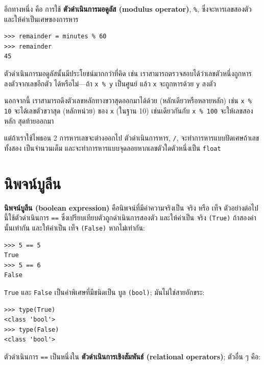 อีกทางหนึ่ง คือ การใช้ {\bf ตัวดำเนินการมอดูลัส (modulus operator)}, \verb"%", ซึ่งจะหารเลขสองตัว
และให้ค่าเป็นเศษของการหาร

\begin{verbatim}
>>> remainder = minutes % 60
>>> remainder
45
\end{verbatim}
%
ตัวดำเนินการมอดูลัสนั้นมีประโยชน์มากกว่าที่คิด เช่น เราสามารถตรวจสอบได้ว่าเลขตัวหนึ่งถูกหารลงตัวจากเลขอีกตัว
ได้หรือไม่---ถ้า {\tt x \% y} เป็นศูนย์ แล้ว {\tt x} จะถูกหารด้วย {\tt y} ลงตัว

นอกจากนี้ เราสามารถดึงตัวเลขหลักทางขวาสุดออกมาได้ด้วย (หลักเดียวหรือหลายหลัก) เช่น {\tt x \% 10} 
จะได้เลขตัวขวาสุด (หลักหน่วย) ของ {\tt x} (ในฐาน 10) เช่นเดียวกันกับ {\tt x \% 100} จะให้เลขสองหลัก
สุดท้ายออกมา

แต่ถ้าเราใช้ไพธอน 2 การหารเลขจะต่างออกไป ตัวดำเนินการหาร, \verb"/", จะทำการหารแบบปัดเศษถ้าเลขทั้งสอง
เป็นจำนวนเต็ม และจะทำการหารแบบจุดลอยหากเลขตัวใดตัวหนึ่งเป็น {\tt float}



\section{นิพจน์บูลีน} %

{\bf นิพจน์บูลีน (boolean expression)} คือนิพจน์ที่มีค่าความจริงเป็น จริง หรือ เท็จ ตัวอย่างต่อไปนี้ใช้ตัวดำเนินการ 
{\tt ==} ซึ่งเปรียบเทียบตัวถูกดำเนินการสองตัว และให้ค่าเป็น จริง {\tt (True)} ถ้าสองค่านั้นเท่ากัน และให้ค่าเป็น
เท็จ {\tt (False)} หากไม่เท่ากัน:  

\begin{verbatim}
>>> 5 == 5
True
>>> 5 == 6
False
\end{verbatim}
%
{\tt True} และ {\tt False} เป็นค่าพิเศษที่มีชนิดเป็น บูล {\tt (bool)}; มันไม่ใช่สายอักขระ:

\begin{verbatim}
>>> type(True)
<class 'bool'>
>>> type(False)
<class 'bool'>
\end{verbatim}
%
ตัวดำเนินการ {\tt ==} เป็นหนึ่งใน {\bf ตัวดำเนินการเชิงสัมพันธ์ (relational operators)}; ตัวอื่น ๆ คือ:

